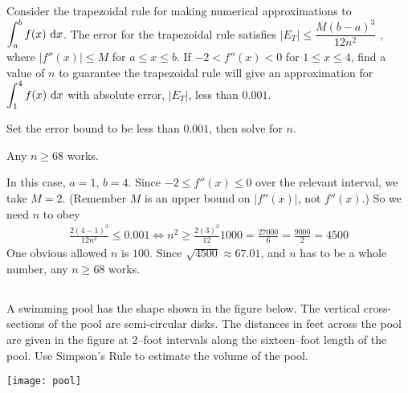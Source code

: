 




\begin{Mquestion}[2014A]
Consider the trapezoidal rule for making numerical approximations to
$\displaystyle\int_a^b f(x)\ \mathrm{d}x$. The error for the trapezoidal rule satisfies
$|E_T| \le \dfrac{ M(b - a)^3}{12n^2}$ , where $|f''(x)| \le M$
for $a \le x \le b$. If $-2 < f''(x) < 0$ for $1 \le x \le 4$,
find a value of $n$ to guarantee the trapezoidal rule will give
an approximation for $\displaystyle\int_1^4 f(x)\ \mathrm{d}x$ with absolute error,
$|E_T|$, less than $0.001$.
\end{Mquestion}

\begin{hint}
Set the error bound to be less than $0.001$, then solve for $n$.
\end{hint}

\begin{answer}
Any  $n\ge 68$ works.
\end{answer}

\begin{solution}
 In this case, $a=1$, $b=4$. Since $-2 \leq f''(x) \leq 0$  over the relevant interval,  we take $M=2$. (Remember $M$ is an upper bound on $|f''(x)|$, not $f''(x)$.) So we need $n$
to obey
\begin{align*}
\frac{ 2(4 - 1)^3}{12n^2} \le 0.001
\iff n^2\ge \frac{2(3)^3}{12} 1000 =\frac{27000}{6}=\frac{9000}{2}=4500
\end{align*}
One obvious allowed $n$ is $100$. Since $\sqrt{4500} \approx 67.01$, and $n$ has to be a whole number,
any  $n\ge 68$ works.
\end{solution}




\subsection*{\Application}

\begin{question}[1996A]
 A swimming pool has the shape shown in the figure below.
The vertical cross-sections of the pool are semi-circular disks. The
distances in feet across the pool are given in the figure at 2--foot intervals along
the sixteen--foot length of the pool. Use Simpson's Rule to estimate the
volume of the pool.

\begin{center}
       \texttt{[image: pool]}
\end{center}

\end{question}

